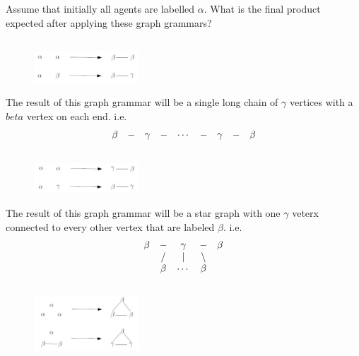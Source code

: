 \documentclass[]{article}
\numberwithin{equation}{section}
\begin{document}
\newpage
\section{}
Assume that initially all agents are labelled $\alpha$. 
What is the final product expected after applying these graph grammars?

\subsection{}
\begin{figure}[h]
    \centering
    \includegraphics[width=0.35\textwidth]{figs/pblm7a_rules.png}
\end{figure}

The result of this graph grammar will be a single long chain of $\gamma$ vertices with a $beta$ vertex on each end. 
i.e.\[\mqty{
        \beta &- & \gamma &- &\cdots &- &\gamma &- &\beta
}\]

\subsection{}
\begin{figure}[h]
    \centering
    \includegraphics[width=0.35\textwidth]{figs/pblm7b_rules.png}
\end{figure}

The result of this graph grammar will be a star graph with one $\gamma$ veterx connected to every other vertex that are labeled $\beta$.
i.e.\[\mqty{
        \beta   &-  &\gamma &-  &\beta\\
                &/  &|      &\backslash &\\
        &\beta   &\cdots &\beta&
}\]


\subsection{}
\begin{figure}[h]
    \centering
    \includegraphics[width=0.35\textwidth]{figs/pblm7c_rules.png}
\end{figure}
\end{document}
